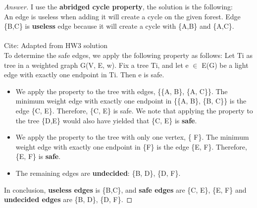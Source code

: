 \documentclass[11pt]{article}
\theoremstyle{definition}
\theoremstyle{definition}
\theoremstyle{definition}
\begin{document}
\begin{proof}[Answer]
I use the \textbf{abridged cycle property}, the solution is the following:\\
An edge is useless when adding it will create a cycle on the given forest. Edge \{B,C\}  is \textbf{useless} edge because it will create a cycle with \{A,B\} and \{A,C\}.\\
\\Cite: Adapted from HW3 solution\\
To determine the safe edges, we apply the following property as follows:
Let Ti as tree in a weighted graph G(V, E, w). Fix a tree Ti, and let e $\in$ E(G) be a light edge with exactly one endpoint in Ti. Then e is safe.\\
\begin{itemize}
\item We apply the property to the tree with edges, \{\{A, B\}, \{A, C\}\}. The minimum weight edge with exactly
one endpoint in \{\{A, B\}, \{B, C\}\} is the edge \{C, E\}. Therefore, \{C, E\} is safe. We note that applying
the property to the tree \{D,E\} would also have yielded that \{C, E\} is \textbf{safe}.
\item We apply the property to the tree with only one vertex, \{ F\}. The minimum weight edge with exactly one
endpoint in \{F\} is the edge \{E, F\}. Therefore, \{E, F\} is \textbf{safe}.
\item The remaining edges are \textbf{undecided}: \{B, D\}, \{D, F\}.
\end{itemize}
In conclusion, \textbf{useless edges} is \{B,C\}, and \textbf{safe edges} are \{C, E\}, \{E, F\} and \textbf{undecided edges}
are \{B, D\}, \{D, F\}.
\end{proof}




\end{document}
